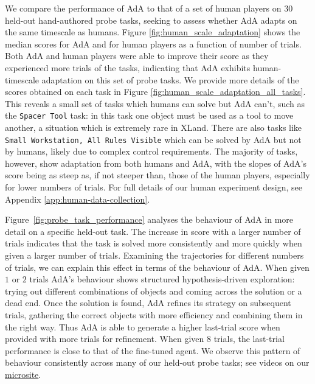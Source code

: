 We compare the performance of AdA to that of a set of human players on $30$ held-out hand-authored probe tasks, seeking to assess whether AdA adapts on the same timescale as humans. Figure \ref{fig:human_scale_adaptation} shows the median scores for AdA and for human players as a function of number of trials. Both AdA and human players were able to improve their score as they experienced more trials of the tasks, indicating that AdA exhibits human-timescale adaptation on this set of probe tasks. We provide more details of the scores obtained on each task in Figure \ref{fig:human_scale_adaptation_all_tasks}. This reveals a small set of tasks which humans can solve but AdA can't, such as the \texttt{Spacer Tool} task: in this task one object must be used as a tool to move another, a situation which is extremely rare in XLand. There are also tasks like \texttt{Small Workstation, All Rules Visible} which can be solved by AdA but not by humans, likely due to complex control requirements. The majority of tasks, however, show adaptation from both humans and AdA, with the slopes of AdA's score being as steep as, if not steeper than, those of the human players, especially for lower numbers of trials. For full details of our human experiment design, see Appendix \ref{app:human-data-collection}.

Figure~\ref{fig:probe_task_performance} analyses the behaviour of AdA in more detail on a specific held-out task. The increase in score with a larger number of trials indicates that the task is solved more consistently and more quickly when given a larger number of trials. Examining the trajectories for different numbers of trials, we can explain this effect in terms of the behaviour of AdA. When given $1$ or $2$ trials AdA's behaviour shows structured hypothesis-driven exploration: trying out different combinations of objects and coming across the solution or a dead end. Once the solution is found, AdA refines its strategy on subsequent trials, gathering the correct objects with more efficiency and combining them in the right way. Thus AdA is able to generate a higher last-trial score when provided with more trials for refinement. When given $8$ trials, the last-trial performance is close to that of the fine-tuned agent. We observe this pattern of behaviour consistently across many of our held-out probe tasks; see videos on our \href{http://sites.google.com/view/adaptive-agent/}{microsite}.

